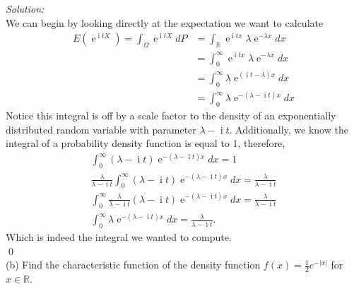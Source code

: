 \documentclass[10pt]{amsart}
\DeclareMathOperator{\E}{e}
\DeclareMathOperator{\I}{i}
\begin{document}
\noindent
\textit{Solution:} \\
We can begin by looking directly at the expectation we want to calculate
\begin{align*}
E(\E^{\I tX}) = \int_\Omega \E^{\I tX} dP
	&= \int_{\mathbb R} \E^{\I tx} \lambda \E^{-\lambda x} dx \\
	&= \int_{0}^\infty \E^{\I tx} \lambda \E^{-\lambda x} dx \\
	&= \int_{0}^\infty \lambda \E^{(\I t -\lambda) x} dx \\
	&= \int_{0}^\infty \lambda \E^{-(\lambda- \I t) x} dx
\end{align*}
Notice this integral is off by a scale factor to the density of an exponentially distributed random variable with parameter $\lambda - \I t$.
Additionally, we know the integral of a probability density function is equal to 1, therefore, 
\begin{align*}
\int_{0}^\infty (\lambda - \I t) \E^{-(\lambda- \I t) x} dx = 1 \\
\frac \lambda {\lambda - \I t} \int_{0}^\infty (\lambda - \I t) \E^{-(\lambda- \I t) x} dx = \frac \lambda {\lambda - \I t} \\
\int_{0}^\infty \frac \lambda {\lambda - \I t} (\lambda - \I t) \E^{-(\lambda- \I t) x} dx = \frac \lambda {\lambda - \I t} \\
\int_{0}^\infty \lambda \E^{-(\lambda- \I t) x} dx = \frac \lambda {\lambda - \I t}.
\end{align*}
Which is indeed the integral we wanted to compute. \\
\qed \\

\noindent
(b) Find the characteristic function of the density function $f(x)=\frac{1}{2}e^{-|x|}$ for $x\in \mathds{R}$.
\\
\end{document}
